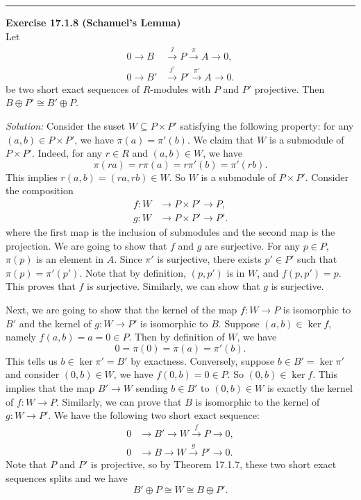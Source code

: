 \documentclass[a4paper, 12pt]{article}
\newenvironment{problem}[2][Exercise]
    { \begin{mdframed}[backgroundcolor=gray!20] \textbf{#1 #2} \\}
    {  \end{mdframed}}
\newenvironment{solution}
    {\textit{Solution:}}
    {}
\begin{document}
\noindent\rule{7in}{2.8pt}
\begin{problem}{17.1.8 (Schanuel's Lemma)}
Let 
\begin{align*}
    0\rightarrow B&\xrightarrow{j} P\xrightarrow{\pi} A\rightarrow 0,\\
    0\rightarrow B'&\xrightarrow{j'} P'\xrightarrow{\pi'} A\rightarrow 0.
\end{align*}
be two short exact sequences of \(R\)-modules with \(P\) and \(P'\) projective. Then \(B\oplus P'\cong B'\oplus P\).
\end{problem}
\begin{solution}
Consider the suset \(W\subseteq P\times P'\) satisfying the following property: for any \((a,b)\in P\times P'\), we have \(\pi(a)=\pi'(b)\). We claim that \(W\) is a submodule of \(P\times P'\). Indeed, for 
any \(r\in R\) and \((a,b)\in W\), we have 
\[\pi(ra)=r\pi(a)=r\pi'(b)=\pi'(rb).\]
This implies \(r(a,b)=(ra,rb)\in W\). So \(W\) is a submodule of \(P\times P'\). Consider the composition 
\begin{align*}
    f:W&\rightarrow P\times P'\rightarrow P,\\ 
    g:W&\rightarrow P\times P'\rightarrow P'.
\end{align*}
where the first map is the inclusion of submodules and the second map is the projection. We are going to show that \(f\) and \(g\) are surjective. For any \(p\in P\), \(\pi(p)\) is an element in \(A\). Since \(\pi'\) is surjective, 
there exists \(p'\in P'\) such that \(\pi(p)=\pi'(p')\). Note that by definition, \((p,p')\) is in \(W\), and \(f(p,p')=p\). This proves that \(f\) is surjective. Similarly, we can show that \(g\) is surjective. 

Next, we are going to show that the kernel of the map \(f:W\rightarrow P\) is isomorphic to \(B'\) and the kernel of \(g:W\rightarrow P'\) is isomorphic to \(B\). Suppose \((a,b)\in \ker f\), namely \(f(a,b)=a=0\in P\). Then by definition of \(W\), we have 
\[0=\pi(0)=\pi(a)=\pi'(b).\]
This tells us \(b\in \ker \pi'=B'\) by exactness. Conversely, suppose \(b\in B'=\ker \pi'\) and consider \((0,b)\in W\), we have \(f(0,b)=0\in P\). So \((0,b)\in \ker f\).
This implies that the map \(B'\rightarrow W\) sending \(b\in B'\) to \((0,b)\in W\) is exactly the kernel of \(f:W\rightarrow P\). Similarly, we can prove that \(B\) is isomorphic to the kernel of \(g:W\rightarrow P'\). We have the following two 
short exact sequence:
\begin{align*}
    0&\rightarrow B'\rightarrow W\xrightarrow{f}P\rightarrow 0,\\ 
    0&\rightarrow B\rightarrow W\xrightarrow{g}P'\rightarrow 0.
\end{align*}
Note that \(P\) and \(P'\) is projective, so by Theorem 17.1.7, these two short exact sequences splits and we have 
\[B'\oplus P\cong W\cong B\oplus P'.\]
\end{solution}
\end{document}
